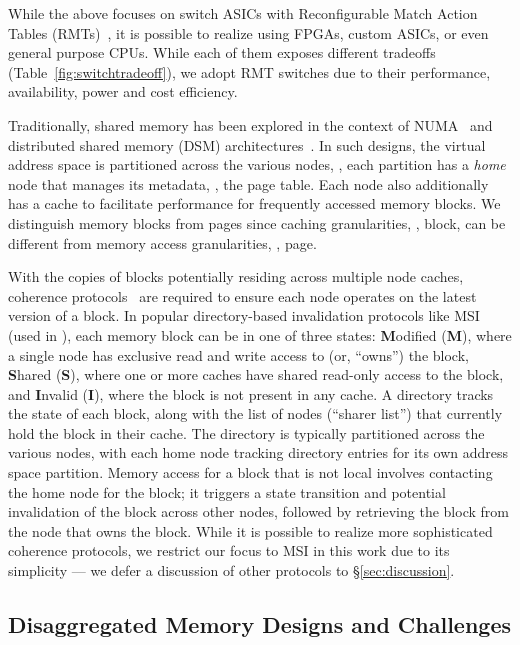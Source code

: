 While the above focuses on switch ASICs with Reconfigurable Match Action Tables (RMTs)~\cite{rmt}, it is possible to realize \mind using FPGAs, custom ASICs, or even general purpose CPUs. While each of them exposes different tradeoffs (Table~\ref{fig:switchtradeoff}), we adopt RMT switches due to their performance, availability, power and cost efficiency.

 Traditionally, shared memory has been explored in the context of NUMA~\cite{sgiorigin, amdopteron1, amdopteron2, intelqpi1, intelqpi2} and distributed shared memory (DSM) architectures~\cite{munin, midway, dpram, gam, dash}. In such designs, the virtual address space is partitioned across the various nodes, \ie, each partition has a \textit{home} node that manages its metadata, \eg, the page table. Each node also additionally has a cache to facilitate performance for frequently accessed memory blocks. We distinguish memory blocks from pages since caching granularities, \ie, block, can be different from memory access granularities, \ie, page. 

With the copies of blocks potentially residing across multiple node caches, coherence protocols~\cite{msi, mesi, mesif, moesi, mosi} are required to ensure each node operates on the latest version of a block. In popular directory-based invalidation protocols like MSI~\cite{msi} (used in \mind), each memory block can be in one of three states: \textbf{M}odified (\textbf{M}), where a single node has exclusive read and write access to (or, ``owns'') the block, \textbf{S}hared (\textbf{S}), where one or more caches have shared read-only access to the block, and \textbf{I}nvalid (\textbf{I}), where the block is not present in any cache. A directory tracks the state of each block, along with the list of nodes (``sharer list'') that currently hold the block in their cache. The directory is typically partitioned across the various nodes, with each home node tracking directory entries for its own address space partition. Memory access for a block that is not local involves contacting the home node for the block; it triggers a state transition and potential invalidation of the block across other nodes, followed by retrieving the block from the node that owns the block. While it is possible to realize more sophisticated coherence protocols, we restrict our focus to MSI in this work due to its simplicity --- we defer a discussion of other protocols to \S\ref{sec:discussion}.

\subsection{Disaggregated Memory Designs and Challenges}
\label{ssec:challenges}

